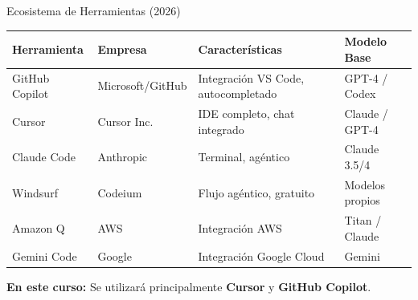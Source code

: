 \documentclass[aspectratio=169]{beamer}
\begin{document}
\begin{frame}{Ecosistema de Herramientas (2026)}
    \begin{table}[]
        \centering
        \renewcommand{\arraystretch}{1.3}
        \scriptsize
        \begin{tabular}{p{2.5cm} p{3cm} p{4cm} p{3cm}}
            \toprule
            \textbf{Herramienta} & \textbf{Empresa} & \textbf{Características} & \textbf{Modelo Base} \\
            \midrule
            GitHub Copilot & Microsoft/GitHub & Integración VS Code, autocompletado & GPT-4 / Codex \\
            Cursor & Cursor Inc. & IDE completo, chat integrado & Claude / GPT-4 \\
            Claude Code & Anthropic & Terminal, agéntico & Claude 3.5/4 \\
            Windsurf & Codeium & Flujo agéntico, gratuito & Modelos propios \\
            Amazon Q & AWS & Integración AWS & Titan / Claude \\
            Gemini Code & Google & Integración Google Cloud & Gemini \\
            \bottomrule
        \end{tabular}
    \end{table}
    
    \vspace{0.3cm}
    \centering
    \textbf{En este curso:} Se utilizará principalmente \textbf{Cursor} y \textbf{GitHub Copilot}.
\end{frame}
\end{document}
